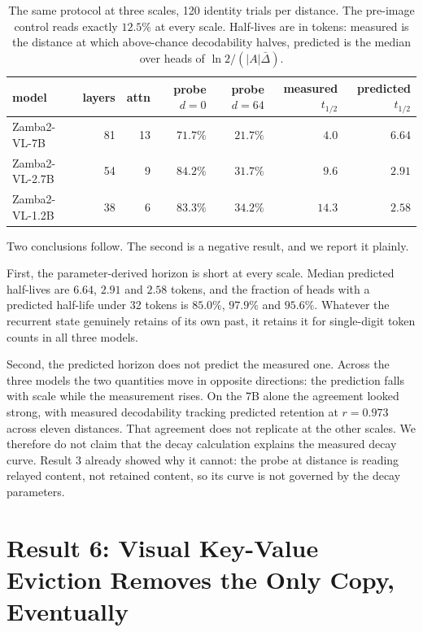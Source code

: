 \documentclass{article}
\begin{document}
\begin{table}[h]
\centering\small
\begin{tabular}{lrrrrrr}
\toprule
model & layers & attn & probe $d{=}0$ & probe $d{=}64$ & measured $t_{1/2}$ & predicted $t_{1/2}$ \\
\midrule
Zamba2-VL-7B   & 81 & 13 & $71.7\%$ & $21.7\%$ & $4.0$  & $6.64$ \\
Zamba2-VL-2.7B & 54 &  9 & $84.2\%$ & $31.7\%$ & $9.6$  & $2.91$ \\
Zamba2-VL-1.2B & 38 &  6 & $83.3\%$ & $34.2\%$ & $14.3$ & $2.58$ \\
\bottomrule
\end{tabular}
\caption{The same protocol at three scales, 120 identity trials per distance.
The pre-image control reads exactly $12.5\%$ at every scale. Half-lives are in
tokens: measured is the distance at which above-chance decodability halves,
predicted is the median over heads of $\ln 2/(|A|\bar{\Delta})$.}
\label{tab:scale}
\end{table}

Two conclusions follow. The second is a negative result, and we report it
plainly.

First, the parameter-derived horizon is short at every scale. Median predicted
half-lives are $6.64$, $2.91$ and $2.58$ tokens, and the fraction of heads
with a predicted half-life under 32 tokens is $85.0\%$, $97.9\%$ and $95.6\%$.
Whatever the recurrent state genuinely retains of its own past, it retains it
for single-digit token counts in all three models.

Second, the predicted horizon does not predict the measured one. Across the
three models the two quantities move in opposite directions: the prediction
falls with scale while the measurement rises. On the 7B alone the agreement
looked strong, with measured decodability tracking predicted retention at
$r = 0.973$ across eleven distances. That agreement does not replicate at the
other scales. We therefore do not claim that the decay calculation explains
the measured decay curve. Result 3 already showed why it cannot: the probe at
distance is reading relayed content, not retained content, so its curve is not
governed by the decay parameters.

\section{Result 6: Visual Key-Value Eviction Removes the Only Copy, Eventually}
\end{document}
